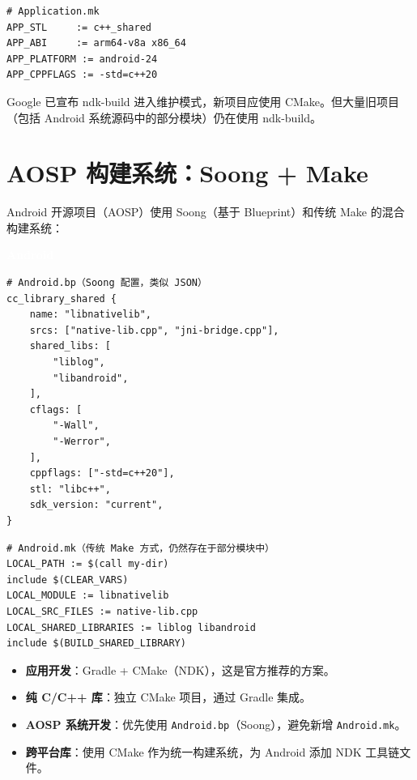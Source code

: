 \documentclass[12pt,a4paper,fontset=fandol]{ctexbook}
\newcommand{\Tp}[1]{\texttt{#1}}
\newcommand{\androidlabel}{%
  \noindent\begin{tcolorbox}[sharp corners,colback=androidheadbg!80!black,colframe=androidheadbg!80!black,
    left=6pt,right=6pt,top=2pt,bottom=2pt,boxrule=0pt]
  \textcolor{white}{\small\bfseries\sffamily Android}\end{tcolorbox}%
}
\begin{document}
\begin{lstlisting}[style=bashstyle]
# Application.mk
APP_STL     := c++_shared
APP_ABI     := arm64-v8a x86_64
APP_PLATFORM := android-24
APP_CPPFLAGS := -std=c++20
\end{lstlisting}

\begin{note}
Google 已宣布 ndk-build 进入维护模式，新项目应使用 CMake。但大量旧项目（包括 Android 系统源码中的部分模块）仍在使用 ndk-build。
\end{note}

\section{AOSP 构建系统：Soong + Make}

Android 开源项目（AOSP）使用 Soong（基于 Blueprint）和传统 Make 的混合构建系统：

\androidlabel
\begin{lstlisting}[style=bashstyle]
# Android.bp（Soong 配置，类似 JSON）
cc_library_shared {
    name: "libnativelib",
    srcs: ["native-lib.cpp", "jni-bridge.cpp"],
    shared_libs: [
        "liblog",
        "libandroid",
    ],
    cflags: [
        "-Wall",
        "-Werror",
    ],
    cppflags: ["-std=c++20"],
    stl: "libc++",
    sdk_version: "current",
}
\end{lstlisting}

\begin{lstlisting}[style=bashstyle]
# Android.mk（传统 Make 方式，仍然存在于部分模块中）
LOCAL_PATH := $(call my-dir)
include $(CLEAR_VARS)
LOCAL_MODULE := libnativelib
LOCAL_SRC_FILES := native-lib.cpp
LOCAL_SHARED_LIBRARIES := liblog libandroid
include $(BUILD_SHARED_LIBRARY)
\end{lstlisting}

\begin{bestpractice}[title=Android 构建系统选择]
\begin{itemize}
  \item \textbf{应用开发}：Gradle + CMake（NDK），这是官方推荐的方案。
  \item \textbf{纯 C/C++ 库}：独立 CMake 项目，通过 Gradle 集成。
  \item \textbf{AOSP 系统开发}：优先使用 \Tp{Android.bp}（Soong），避免新增 \Tp{Android.mk}。
  \item \textbf{跨平台库}：使用 CMake 作为统一构建系统，为 Android 添加 NDK 工具链文件。
\end{itemize}
\end{bestpractice}
\end{document}
